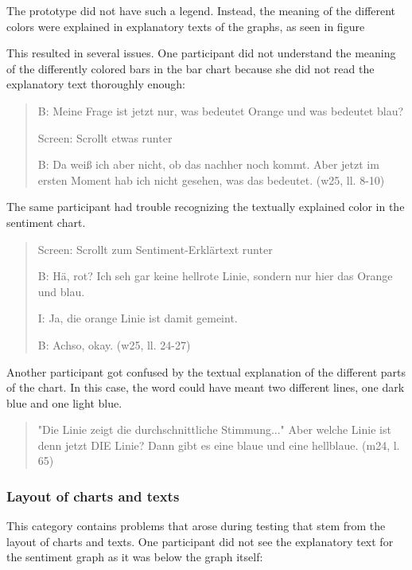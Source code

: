 The prototype did not have such a legend. Instead, the meaning of the different colors were explained in explanatory texts of the graphs, as seen in figure %


This resulted in several issues. One participant did not understand the meaning of the differently colored bars in the bar chart because she did not read the explanatory text thoroughly enough:

\begin{quote}
    B: Meine Frage ist jetzt nur, was bedeutet Orange und was bedeutet blau? 

    Screen: Scrollt etwas runter

    B: Da weiß ich aber nicht, ob das nachher noch kommt. Aber jetzt im ersten Moment hab ich nicht gesehen, was das bedeutet. (w25, ll. 8-10)
\end{quote}

The same participant had trouble recognizing the textually explained color in the sentiment chart.

\begin{quote}
    Screen: Scrollt zum Sentiment-Erklärtext runter

    B: Hä, rot? Ich seh gar keine hellrote Linie, sondern nur hier das Orange und blau.

    I: Ja, die orange Linie ist damit gemeint.

    B: Achso, okay. (w25, ll. 24-27)
\end{quote}

Another participant got confused by the textual explanation of the different parts of the chart. In this case, the word  could have meant two different lines, one dark blue and one light blue.

\begin{quote}
    "Die Linie zeigt die durchschnittliche Stimmung..." Aber welche Linie ist denn jetzt DIE Linie? Dann gibt es eine blaue und eine hellblaue. (m24, l. 65)
\end{quote}

\subsubsection*{Layout of charts and texts}
This category contains problems that arose during testing that stem from the layout of charts and texts. One participant did not see the explanatory text for the sentiment graph as it was below the graph itself:

